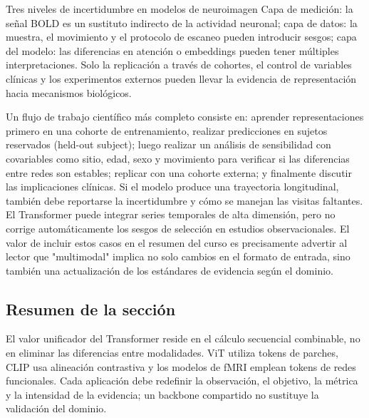 


\begin{warningbox}{Tres niveles de incertidumbre en modelos de neuroimagen}
Capa de medición: la señal BOLD es un sustituto indirecto de la actividad neuronal; capa de datos: la muestra, el movimiento y el protocolo de escaneo pueden introducir sesgos; capa del modelo: las diferencias en atención o embeddings pueden tener múltiples interpretaciones. Solo la replicación a través de cohortes, el control de variables clínicas y los experimentos externos pueden llevar la evidencia de representación hacia mecanismos biológicos.
\end{warningbox}

Un flujo de trabajo científico más completo consiste en: aprender representaciones primero en una cohorte de entrenamiento, realizar predicciones en sujetos reservados (held-out subject); luego realizar un análisis de sensibilidad con covariables como sitio, edad, sexo y movimiento para verificar si las diferencias entre redes son estables; replicar con una cohorte externa; y finalmente discutir las implicaciones clínicas. Si el modelo produce una trayectoria longitudinal, también debe reportarse la incertidumbre y cómo se manejan las visitas faltantes. El Transformer puede integrar series temporales de alta dimensión, pero no corrige automáticamente los sesgos de selección en estudios observacionales. El valor de incluir estos casos en el resumen del curso es precisamente advertir al lector que "multimodal" implica no solo cambios en el formato de entrada, sino también una actualización de los estándares de evidencia según el dominio.

\subsection{Resumen de la sección}

El valor unificador del Transformer reside en el cálculo secuencial combinable, no en eliminar las diferencias entre modalidades. ViT utiliza tokens de parches, CLIP usa alineación contrastiva y los modelos de fMRI emplean tokens de redes funcionales. Cada aplicación debe redefinir la observación, el objetivo, la métrica y la intensidad de la evidencia; un backbone compartido no sustituye la validación del dominio.


